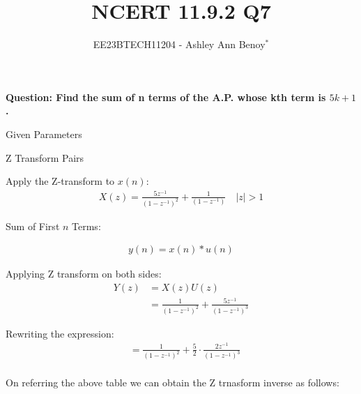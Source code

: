 \documentclass[journal,12pt,twocolumn]{IEEEtran}
\theoremstyle{remark}
\begin{document}

\vspace{3cm}

\title{NCERT 11.9.2  Q7}
\author{EE23BTECH11204 - Ashley Ann Benoy$^{*}$}%
\maketitle
\newpage
\bigskip

\renewcommand{\thefigure}{\theenumi}
\renewcommand{\thetable}{\theenumi}



\textbf{Question: Find the sum of n terms of the A.P. whose kth term is \(5k + 1\).}\\

\solution
\begin{table}[h!]
	\centering
	 \resizebox{6cm}{!}{
	 	
	 	}
	 	\caption{Given Parameters}
	 	\label{tab:my_label}
 \end{table}
 \begin{table}[h!]
	\centering
	 \resizebox{6cm}{!}{
	 	
	 	}
	 	\caption{Z Transform Pairs}
	 	\label{tab:my_label}
 \end{table}



Apply the Z-transform to \( x(n) \):
\begin{align}
X(z) = \frac{5z^{-1}}{(1 - z^{-1})^2} + \frac{1}{(1 - z^{-1})}
\quad |z|>1
\end{align}

Sum of First \( n \) Terms:

\begin{align}
y(n) = x(n) * u(n)
\end{align}

Applying Z transform on both sides:
\begin{align}
    Y(z) &= X(z)U(z)\\
    &=\frac{1}{(1-z^{-1})^2} + \frac{5z^{-1}}{(1-z^{-1})^3}
\end{align}




Rewriting the expression:
\begin{align}
&=\frac{1}{(1 - z^{-1})^2} + \frac{5}{2} \cdot \frac{2z^{-1}}{(1 - z^{-1})^3} 
\end{align}
\\
On referring the above table we can obtain the  Z trnasform inverse as follows:
\end{document}

